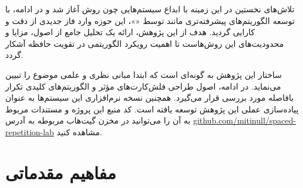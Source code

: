\documentclass[12pt]{report}
\begin{document}
تلاش‌های نخستین در این زمینه با ابداع سیستم‌هایی چون روش  آغاز شد و در ادامه، با توسعه الگوریتم‌های پیشرفته‌تری مانند  توسط «»، این حوزه وارد فاز جدیدی از دقت و کارایی گردید. هدف از این پژوهش، ارائه یک تحلیل جامع از اصول، مزایا و محدودیت‌های این روش‌هاست تا اهمیت رویکرد الگوریتمی در تقویت حافظه آشکار گردد.

ساختار این پژوهش به گونه‌ای است که ابتدا مبانی نظری و علمی موضوع را تبیین می‌نماید. در ادامه، اصول طراحی فلش‌کارت‌های مؤثر و الگوریتم‌های کلیدی تکرار بافاصله مورد بررسی قرار می‌گیرد. همچنین نسخه نرم‌افزاری این سیستم‌ها به عنوان پیاده‌سازی عملی این پژوهش توسعه یافته است.
کد منبع این پروژه و مستندات مربوط به آن را می‌توانید در مخزن گیت‌هاب مربوطه به آدرس
\href{https://github.com/mitinull/spaced-repetition-lab}{github.com/mitinull/spaced-repetition-lab}
مشاهده کنید.

\tableofcontents

\chapter{مفاهیم مقدماتی}

\pagestyle{plain}
\setcounter{page}{1}



\end{document}
